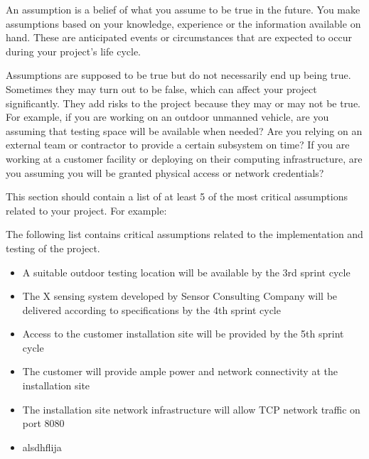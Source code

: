 An assumption is a belief of what you assume to be true in the future. You make assumptions based on your knowledge, experience or the information available on hand. These are anticipated events or circumstances that are expected to occur during your project's life cycle.

Assumptions are supposed to be true but do not necessarily end up being true. Sometimes they may turn out to be false, which can affect your project significantly. They add risks to the project because they may or may not be true. For example, if you are working on an outdoor unmanned vehicle, are you assuming that testing space will be available when needed? Are you relying on an external team or contractor to provide a certain subsystem on time? If you are working at a customer facility or deploying on their computing infrastructure, are you assuming you will be granted physical access or network credentials?

This section should contain a list of at least 5 of the most critical assumptions related to your project. For example:

The following list contains critical assumptions related to the implementation and testing of the project.

\begin{itemize}
  \item A suitable outdoor testing location will be available by the 3rd sprint cycle
  \item The X sensing system developed by Sensor Consulting Company will be delivered according to specifications by the 4th sprint cycle
  \item Access to the customer installation site will be provided by the 5th sprint cycle
  \item The customer will provide ample power and network connectivity at the installation site
  \item The installation site network infrastructure will allow TCP network traffic on port 8080
  \item alsdhflija
\end{itemize}